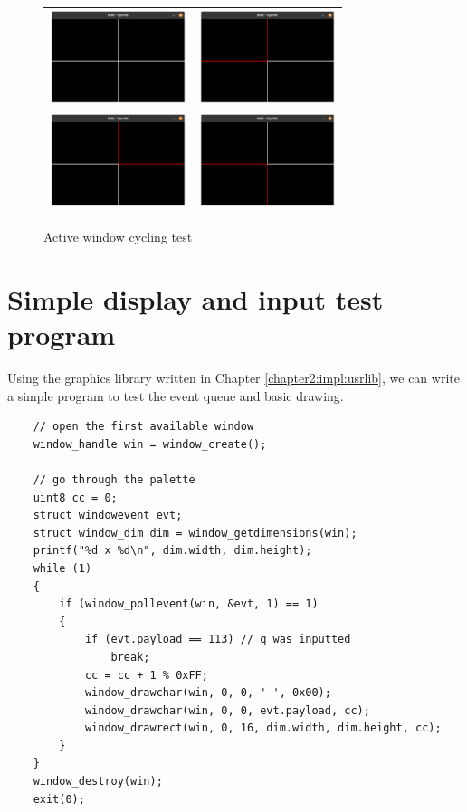 \begin{figure}[H]
    \centering
    \begin{tabular}{cc}
    \includegraphics[width=4cm]{active0.png} & \includegraphics[width=4cm]{active1.png} \\
    \includegraphics[width=4cm]{active2.png} & \includegraphics[width=4cm]{active3.png} \\
    \end{tabular}
    \caption{Active window cycling test}
    \label{figure:windowswitch}
\end{figure}

\section{Simple display and input test program}

Using the graphics library written in Chapter \ref{chapter2:impl:usrlib}, we can
write a simple program to test the event queue and basic drawing.

\begin{listing}[H]
    \begin{verbatim}
    // open the first available window
    window_handle win = window_create();

    // go through the palette
    uint8 cc = 0;
    struct windowevent evt;
    struct window_dim dim = window_getdimensions(win);
    printf("%d x %d\n", dim.width, dim.height);
    while (1)
    {
        if (window_pollevent(win, &evt, 1) == 1)
        {
            if (evt.payload == 113) // q was inputted
                break;
            cc = cc + 1 % 0xFF;
            window_drawchar(win, 0, 0, ' ', 0x00);
            window_drawchar(win, 0, 0, evt.payload, cc);
            window_drawrect(win, 0, 16, dim.width, dim.height, cc);
        }
    }
    window_destroy(win);
    exit(0);
    \end{verbatim}
\end{listing}

